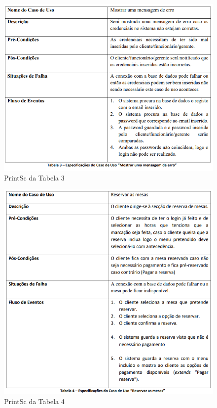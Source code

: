 \FloatBarrier
\begin{figure}[!hbt]
    \centering
    \includegraphics[width=14cm]{Resources/TablesPrintSc/3.png}
    \caption{PrintSc da Tabela 3}
    
\end{figure}
\FloatBarrier
\begin{figure}[!hbt]
    \centering
    \includegraphics[width=14cm]{Resources/TablesPrintSc/4.png}
    \caption{PrintSc da Tabela 4}
    
\end{figure}
